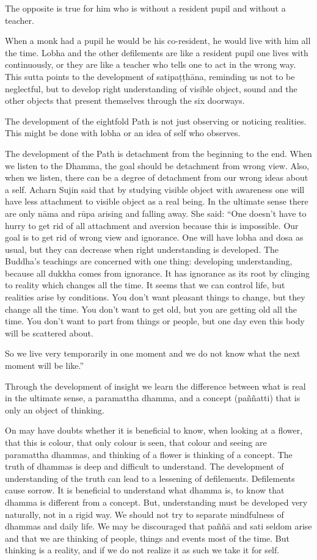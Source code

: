 The opposite is true for him who is without a resident pupil and without a teacher.

When a monk had a pupil he would be his co-resident, he would live with him all the time. Lobha and the other defilements are like a resident pupil one lives with continuously, or they are like a teacher who tells one to act in the wrong way. This sutta points to the development of satipaṭṭhāna, reminding us not to be neglectful, but to develop right understanding of visible object, sound and the other objects that present themselves through the six doorways.

The development of the eightfold Path is not just observing or noticing realities. This might be done with lobha or an idea of self who observes.

The development of the Path is detachment from the beginning to the end. When we listen to the Dhamma, the goal should be detachment from wrong view. Also, when we listen, there can be a degree of detachment from our wrong ideas about a self. Acharn Sujin said that by studying visible object with awareness one will have less attachment to visible object as a real being. In the ultimate sense there are only nāma and rūpa arising and falling away. She said: ``One doesn’t have to hurry to get rid of all attachment and aversion because this is impossible. Our goal is to get rid of wrong view and ignorance. One will have lobha and dosa as usual, but they can decrease when right understanding is developed. The Buddha’s teachings are concerned with one thing: developing understanding, because all dukkha comes from ignorance. It has ignorance as its root by clinging to reality which changes all the time. It seems that we can control life, but realities arise by conditions. You don’t want pleasant things to change, but they change all the time. You don’t want to get old, but you are getting old all the time. You don’t want to part from things or people, but one day even this body will be scattered about.

So we live very temporarily in one moment and we do not know what the next moment will be like.''

Through the development of insight we learn the difference between what is real in the ultimate sense, a paramattha dhamma, and a concept (paññatti) that is only an object of thinking.

On may have doubts whether it is beneficial to know, when looking at a flower, that this is colour, that only colour is seen, that colour and seeing are paramattha dhammas, and thinking of a flower is thinking of a concept. The truth of dhammas is deep and difficult to understand. The development of understanding of the truth can lead to a lessening of defilements. Defilements cause sorrow. It is beneficial to understand what dhamma is, to know that dhamma is different from a concept. But, understanding must be developed very naturally, not in a rigid way. We should not try to separate mindfulness of dhammas and daily life. We may be discouraged that paññā and sati seldom arise and that we are thinking of people, things and events most of the time. But thinking is a reality, and if we do not realize it as such we take it for self.

